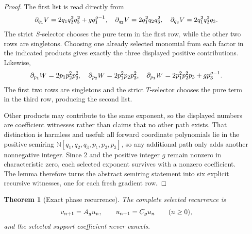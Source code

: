 \documentclass[11pt]{article}
\newtheorem{theorem}{Theorem}[section]
\theoremstyle{remark}
\numberwithin{equation}{section}
\begin{document}
\begin{proof}
The first list is read directly from
\[
\partial_{q_1}V
=2q_1q_2^2q_3^2+gq_1^{g-1},\quad
\partial_{q_2}V=2q_1^2q_2q_3^2,\quad
\partial_{q_3}V=2q_1^2q_2^2q_3.
\]
The strict \(S\)-selector chooses the pure term in the first row, while the
other two rows are singletons.  Choosing one already selected monomial from
each factor in the indicated products gives exactly the three displayed
positive contributions.  Likewise,
\[
\partial_{p_1}W=2p_1p_2^2p_3^2,\quad
\partial_{p_2}W=2p_1^2p_2p_3^2,\quad
\partial_{p_3}W=2p_1^2p_2^2p_3+gp_3^{g-1}.
\]
The first two rows are singletons and the strict \(T\)-selector chooses the
pure term in the third row, producing the second list.

Other products may contribute to the same exponent, so the displayed numbers
are coefficient witnesses rather than claims that no other path exists.  That
distinction is harmless and useful: all forward coordinate polynomials lie in
the positive semiring \(\mathbb N[q_1,q_2,q_3,p_1,p_2,p_3]\), so any additional
path only adds another nonnegative integer.  Since \(2\) and the positive
integer \(g\) remain nonzero in characteristic zero, each selected exponent
survives with a nonzero coefficient.  The lemma therefore turns the abstract
semiring statement into six explicit recursive witnesses, one for each fresh
gradient row.
\end{proof}

\begin{theorem}[Exact phase recurrence]\label{thm:recurrence}
The complete selected recurrence is
\[
v_{n+1}=A_g u_n,\qquad u_{n+1}=C_g u_n\qquad (n\geq 0),
\]
and the selected support coefficient never cancels.
\end{theorem}
\end{document}

